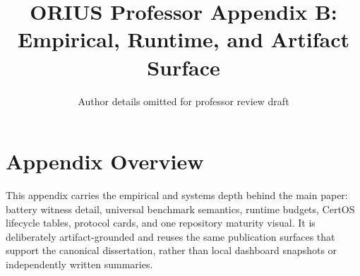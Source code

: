 \documentclass[10pt,journal,onecolumn]{IEEEtran}
\title{ORIUS Professor Appendix B: Empirical, Runtime, and Artifact Surface}
\author{Author details omitted for professor review draft}
\date{}
\begin{document}
\maketitle

\section{Appendix Overview}
\label{sec:prof-app-b-overview}

This appendix carries the empirical and systems depth behind the main paper: battery
witness detail, universal benchmark semantics, runtime budgets, CertOS lifecycle
tables, protocol cards, and one repository maturity visual. It is deliberately
artifact-grounded and reuses the same publication surfaces that support the canonical
dissertation, rather than local dashboard snapshots or independently written summaries.

\label{ch:hil}
\label{ch:compositional-safety-fleets}



\end{document}
